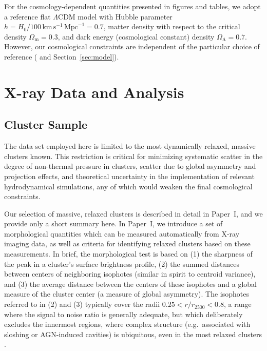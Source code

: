 \documentclass[useAMS,usenatbib,usegraphicx]{mn2e}
\newcommand*{\mysub}[2]{\ensuremath{#1_{\mathrm{#2}}}}
\newcommand*{\unit}[1]{\ensuremath{\mathrm{\, #1}}}
\newcommand*{\Omegam}{\mysub{\Omega}{m}}
\newcommand*{\Omegal}{\mysub{\Omega}{\Lambda}}
\newcommand*{\LCDM}{\ensuremath{\Lambda}CDM}
\newcommand*{\second}{\unit{s}}
\newcommand*{\km}{\unit{km}}
\newcommand*{\Mpc}{\unit{Mpc}}
\newcommand*{\secref}{Section}
\newcommand*{\arsemf}{\citetalias{Allen0706.0033}}
\newcommand*{\morphpaper}{Paper~I}
\begin{document}
For the cosmology-dependent quantities presented in figures and tables, we adopt a reference flat \LCDM{} model with Hubble parameter $h=H_0/100\km\second^{-1}\Mpc^{-1}=0.7$, matter density with respect to the critical density $\Omegam=0.3$, and dark energy (cosmological constant) density $\Omegal=0.7$. However, our cosmological constraints are independent of the particular choice of reference (\arsemf{} and \secref~\ref{sec:model}).


\section{X-ray Data and Analysis} \label{sec:cosmodata}

\subsection{Cluster Sample} \label{sec:sample}

The data set employed here is limited to the most dynamically relaxed, massive clusters known. This restriction is critical for minimizing systematic scatter in the degree of non-thermal pressure in clusters, scatter due to global asymmetry and projection effects, and theoretical uncertainty in the implementation of relevant hydrodynamical simulations, any of which would weaken the final cosmological constraints.

Our selection of massive, relaxed clusters is described in detail in \morphpaper{}, and we provide only a short summary here. In \morphpaper{}, we introduce a set of morphological quantities which can be measured automatically from X-ray imaging data, as well as criteria for identifying relaxed clusters based on these measurements. In brief, the morphological test is based on (1) the sharpness of the peak in a cluster's surface brightness profile, (2) the summed distances between centers of neighboring isophotes (similar in spirit to centroid variance), and (3) the average distance between the centers of these isophotes and a global measure of the cluster center (a measure of global asymmetry). The isophotes referred to in (2) and (3) typically cover the radii $0.25<r/r_{2500}<0.8$, a range where the signal to noise ratio is generally adequate, but which deliberately excludes the innermost regions, where complex structure (e.g.\ associated with sloshing or AGN-induced cavities) is ubiquitous, even in the most relaxed clusters \citep{McNamara0709.2152, Markevitch0701821}.
\end{document}
